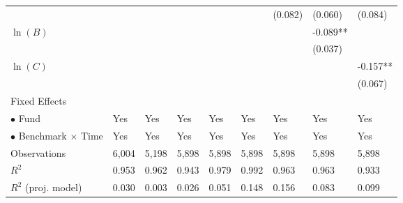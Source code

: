\documentclass[openany]{book}
\theoremstyle{definition}
\theoremstyle{definition}
\theoremstyle{definition}
\theoremstyle{remark}
\begin{document}
\begin{table}[ht]
\begin{tabularx}{0.975\textwidth}{lYYYYYYYY}
   &  &  &  &  &  & (0.082) & (0.060) & (0.084) \\ 
  $\ln(B)$ &  &  &  &  &  &  & -0.089** &  \\ 
   &  &  &  &  &  &  & (0.037) &  \\ 
  $\ln(C)$ &  &  &  &  &  &  &  & -0.157** \\ 
   &  &  &  &  &  &  &  & (0.067) \\ 
  Fixed Effects &  &  &  &  &  &  &  &  \\ 
  $\bullet$ Fund & Yes & Yes & Yes & Yes & Yes & Yes & Yes & Yes \\ 
  $\bullet$ Benchmark $\times$ Time & Yes & Yes & Yes & Yes & Yes & Yes & Yes & Yes \\ 
  Observations & 6,004 & 5,198 & 5,898 & 5,898 & 5,898 & 5,898 & 5,898 & 5,898 \\ 
  $R^2$ & 0.953 & 0.962 & 0.943 & 0.979 & 0.992 & 0.963 & 0.963 & 0.933 \\ 
  $R^2$ (proj. model) & 0.030 & 0.003 & 0.026 & 0.051 & 0.148 & 0.156 & 0.083 & 0.099 \\ 
   \bottomrule
\end{tabularx}
\endgroup
\end{table}
\end{document}
